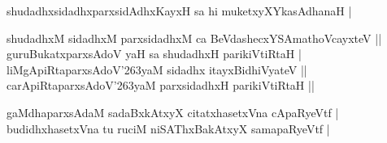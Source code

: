 \begin{entry}
\begin{shl}
shudadhxsidadhxparxsidAdhxKayxH sa hi muketxyXYkasAdhanaH |\\[-1pt]
\end{shl}
\medskip
{}
\medskip
\begin{shl}
shudadhxM sidadhxM parxsidadhxM ca BeVdashecxYSAmathoVcayxteV ||\\[2pt]
guruBukatxparxsAdoV yaH sa shudadhxH parikiVtiRtaH |\\[2pt]
liMgApiRtaparxsAdoV{\char'263}yaM sidadhx itayxBidhiVyateV ||\\[2pt]
carApiRtaparxsAdoV{\char'263}yaM parxsidadhxH parikiVtiRtaH ||\\[-1pt]
\end{shl}
\medskip
{}
\smallskip
{}
\medskip
\begin{shl}
gaMdhaparxsAdaM sadaBxkAtxyX citatxhasetxVna cApaRyeVtf |\\[2pt]
budidhxhasetxVna tu ruciM niSAThxBakAtxyX samapaRyeVtf |
\end{shl}


\end{entry}
